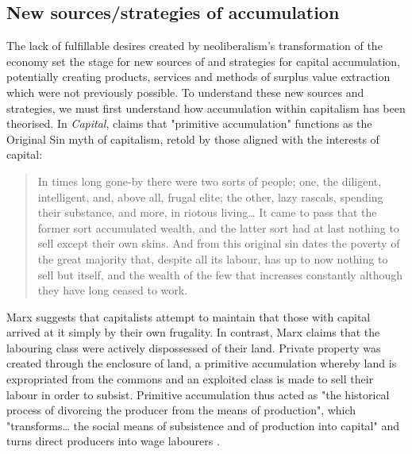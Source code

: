 
\subsection{New sources/strategies of accumulation }
\label{subsec:new-sites-strategies-of-accumulation}

The lack of fulfillable desires created by neoliberalism's transformation of the economy set the stage for  new sources of and strategies for capital accumulation, potentially creating products, services and methods of surplus value extraction which were not previously possible. To understand these new sources and strategies, we must first understand how accumulation within capitalism has been theorised. In \emph{Capital},  \citet[p. 736]{marx_capital_2004} claims that "primitive accumulation" functions as the Original Sin myth of capitalism, retold by those aligned with the interests of capital:

\begin{quote}
In times long gone-by there were two sorts of people; one, the diligent, intelligent, and, above all, frugal elite; the other, lazy rascals, spending their substance, and more, in riotous living\ldots{} It came to pass that the former sort accumulated wealth, and the latter sort had at last nothing to sell except their own skins. And from this original sin dates the poverty of the great majority that, despite all its labour, has up to now nothing to sell but itself, and the wealth of the few that increases constantly although they have long ceased to work.
\end{quote}

Marx suggests that capitalists attempt to maintain that those with capital arrived at it simply by their own frugality. In contrast, Marx claims that the labouring class were actively dispossessed of their land. Private property was created through the enclosure of land, a primitive accumulation whereby land is expropriated from the commons and an exploited class is made to sell their labour  in order to subsist. Primitive accumulation thus acted as "the historical process of divorcing the producer from the means of production", which "transforms\ldots{} the social means of subsistence and of production into capital" and turns direct producers into wage labourers \citep[p. 785]{marx_capital_2004}. 


